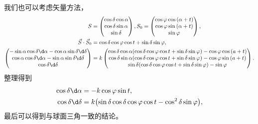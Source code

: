 \documentclass[UTF8, 12pt, a4paper, oneside, onecolumn, fontset=none]{ctexart}
\begin{document}
我们也可以考虑矢量方法，
\begin{align}
S&=\begin{pmatrix}
\cos{\delta}\cos{\alpha}\\
\cos{\delta}\sin{\alpha}\\
\sin{\delta}
\end{pmatrix},
S_{0}=\begin{pmatrix}
\cos{\varphi}\cos{\mleft(\alpha+t\mright)}\\
\cos{\varphi}\sin{\mleft(\alpha+t\mright)}\\
\sin{\varphi}
\end{pmatrix},\\
\vec{S}\cdot\vec{S}_{0}&=\cos{\delta}\cos{\varphi}\cos{t}+\sin{\delta}\sin{\varphi},\\
\begin{pmatrix}
-\sin{\alpha}\cos{\delta}\d\alpha-\cos{\alpha}\sin{\delta}\d\delta\\
\cos{\alpha}\cos{\delta}\d\alpha-\sin{\alpha}\sin{\delta}\d\delta\\
\cos{\delta}\d\delta
\end{pmatrix}&=k
\begin{pmatrix}
\cos{\delta}\cos{\alpha}\mleft(\cos{\delta}\cos{\varphi}\cos{t}+\sin{\delta}\sin{\varphi}\mright)-\cos{\varphi}\cos{\mleft(a+t\mright)}\\
\cos{\delta}\sin{\alpha}\mleft(\cos{\delta}\cos{\varphi}\cos{t}+\sin{\delta}\sin{\varphi}\mright)-\cos{\varphi}\sin{\mleft(a+t\mright)}\\
\sin{\delta}\mleft(\cos{\delta}\cos{\varphi}\cos{t}+\sin{\delta}\sin{\varphi}\mright)-\sin{\varphi}
\end{pmatrix}.
\end{align}
整理得到
\begin{align}
\cos{\delta}\d\alpha&=-k\cos{\varphi}\sin{t},\\
\cos{\delta}\d\delta&=k\mleft(\sin{\delta}\cos{\delta}\cos{\varphi}\cos{t}-\cos^{2}{\delta}\sin{\varphi}\mright),
\end{align}
最后可以得到与球面三角一致的结论。
\end{document}

